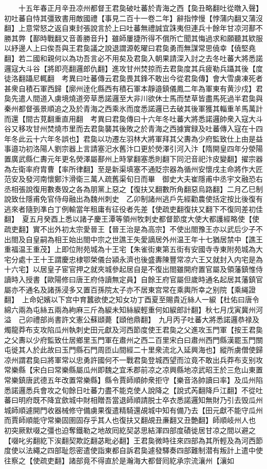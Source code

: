 　　十五年春正月辛丑凉州都督王君㚟破吐蕃於青海之西【㚟丑略翻吐從暾入聲】初吐蕃自恃其彊致書用敵國禮【事見二百十一卷二年】辭指悖慢【悖蒲内翻又蒲沒翻】上意常怒之返自東封張說言於上曰吐蕃無禮誠宜誅夷但連兵十餘年甘凉河鄯不勝其弊【鄯時戰翻又音善勝音升】雖師屢捷所得不償所亡聞其悔過求和願聽其欵服以紓邊人上曰俟吾與王君㚟議之說退謂源乾曜曰君㚟勇而無謀常思僥幸【僥堅堯翻】若二國和親何以為功吾言必不用矣及君㚟入朝果請深入討之去冬吐蕃大將悉諾邏寇大斗谷【將即亮翻邏郎仇翻】進攻甘州焚掠而去君㚟度其兵疲勒兵躡其後【度徒洛翻躡尼輒翻　考異曰吐蕃傳云君㚟畏其鋒不敢出今從君㚟傳】會大雪虜凍死者甚衆自積石軍西歸【廓州逹化縣西有積石軍本靜邉鎮儀鳳二年為軍東有黄沙戍】君㚟先遣人間道入虜境燒道旁草悉諾邏至大非川欲休士馬而埜草皆盡馬死過半君㚟與秦州都督張景順追之及於青海之西乘氷而度悉諾邏已去破其後軍獲其輜重羊馬萬計而還【間古莧翻重直用翻　考異曰君㚟傳曰十六年冬吐蕃大將悉諾邏帥衆入寇大斗谷又移攻甘州焚燒市里而去君㚟襲其後敗之於青海之西據實録及吐蕃傳入寇在十四年冬此云十六年冬誤也】君㚟以功遷左羽林大將軍拜其父夀為少府監致仕上由是益事邉功初洛陽人劉宗器上言請塞汜水舊汴口更於熒澤引河入汴【隋開皇四年分滎陽置廣武縣仁夀元年更名熒澤屬鄯州上時掌翻塞悉則翻下同汜音祀汴皮變翻】擢宗器為左衛率府胄曹【率所律翻】至是新渠填塞不通貶宗器為循州安懷戌主命將作大匠范安及發河南懷鄭汴滑衛三萬人疏舊渠旬日而畢　御史大夫崔隱甫中丞宇文融恐右丞相張說復用數奏毁之各為朋黨上惡之【復扶又翻數所角翻惡烏路翻】二月乙巳制說致仕隱甫免官侍母融出為魏州刺史　乙卯制諸州逃戶先經勸農使括定按比後復有逃來者隨到凖白丁例輸當年租庸有征役者先差【使疏吏翻復扶又翻下不復同差初佳翻】　夏五月癸酉上悉以諸子慶王潭等領州牧刺史都督節度大使大都護經略使【使疏吏翻】實不出外初太宗愛晉王【晉王治是為高宗】不使出閤豫王亦以武后少子不出閤及自皇嗣為相王始出閤中宗之世譙王失愛謫居外州温王年十七猶居禁中【譙王重福温王重茂】上即位附苑城為十王宅【朱雀街東第五街有安國寺寺東附苑城為大宅分處十王十王謂慶忠棣鄂榮儀台潁永濟也後盛夀陳豐常凉六王又就封入内宅是為十六宅】以居皇子宦官押之就夾城參起居自是不復出閤雖開府置官屬及領藩鎮惟侍讀時入授書【歐陽修曰唐王府侍讀無定員】自餘王府官屬但歲時通名起居其藩鎮官屬亦不通名及諸孫浸多又置百孫院太子亦不居東宫常在乘輿所幸之别院【乘䋲證翻】　上命妃嬪以下宫中育蠶欲使之知女功丁酉夏至賜貴近絲人一綟【杜佑曰唐令綿六兩為屯絲五兩為絇麻三斤為綟未知絲綟輕重何如綟郎計翻】秋七月戊寅冀州河溢　己卯禮部尚書許文憲公蘇頲薨【頲他鼎翻】　九月丙子吐蕃大將悉諾邏恭禄及燭龍莽布支攻陷瓜州執刺史田元獻及河西節度使王君㚟之父進攻玉門軍【按王君㚟之父夀以少府監致仕居鄉里玉門軍在肅州之西二百里宋白曰肅州西門縣漢罷玉門關屯徙其人於此故曰玉門縣石門周匝山間經二十里衆流北入延興海也】縱所虜僧使歸凉州謂君㚟曰將軍常以忠勇許國何不一戰君㚟登城西望而泣竟不敢出兵莽布支别攻常樂縣【宋白曰常樂縣屬瓜州即魏之宜禾郡前凉之凉興縣地凉武昭王於三危山東置常樂鎮唐武德五年改置常樂縣】縣令賈師順帥衆拒守【樂音洛帥讀曰率】及瓜州陷悉諾邏悉兵會攻之旬餘日吐蕃力盡不能克使人說降之【說式芮翻降戶江翻】不從吐蕃曰明府既不降宜歛城中財相贈吾當退師順請脱士卒衣悉諾邏知無財乃引去毁瓜州城師順遽開門收器械修守備虜果復遣精騎還覘城中知有備乃去【田元獻不能守瓜州而賈師順能守常樂固圉固存乎其人也復扶又翻覘丑亷翻又丑艶翻】師順岐州人也　初突厥默啜之彊也迫奪鐵勒之地故囘紇契苾思結渾四部度磧徙居甘凉之間以避之【啜叱劣翻紇下涘翻契欺訖翻苾毗必翻】王君㚟微時往來四部為其所輕及為河西節度使以法繩之四部耻怨密遣使詣東都自訴君㚟遽發驛奏四部難制潜有叛計上遣中使往察之【使疏吏翻】諸部竟不得直於是瀚海大都督囘紇承宗流瀼州【瀼如
